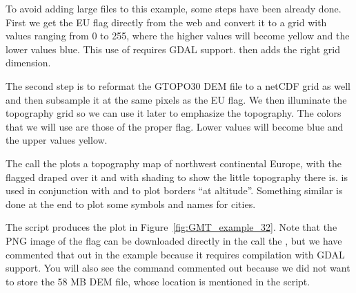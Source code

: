 To avoid adding large files to this example, some steps have been already done. First we get the EU flag
directly from the web and convert it to a grid with values ranging from 0 to 255, where the higher values will become
yellow and the lower values blue. This use of  requires GDAL support.  then adds
the right grid dimension.

The second step is to reformat the GTOPO30 DEM file to a netCDF grid as well and then subsample it at the same pixels
as the EU flag. We then illuminate the topography grid so we can use it later to emphasize the topography.
The colors that we will use are those of the proper flag. Lower values will become blue and the upper values yellow.

The call the  plots a topography map of northwest continental Europe, with the flagged draped over
it and with shading to show the little topography there is.
 is used in conjunction with  and  to plot borders ``at altitude''.
Something similar is done at the end to plot some symbols and names for cities.


The script produces the plot in Figure~\ref{fig:GMT_example_32}. Note that the PNG image of the flag can be
downloaded directly in the call the , but we have commented that out in the example because
it requires compilation with GDAL support. You will also see the  command commented out because
we did not want to store the 58 MB DEM file, whose location is mentioned in the script.


